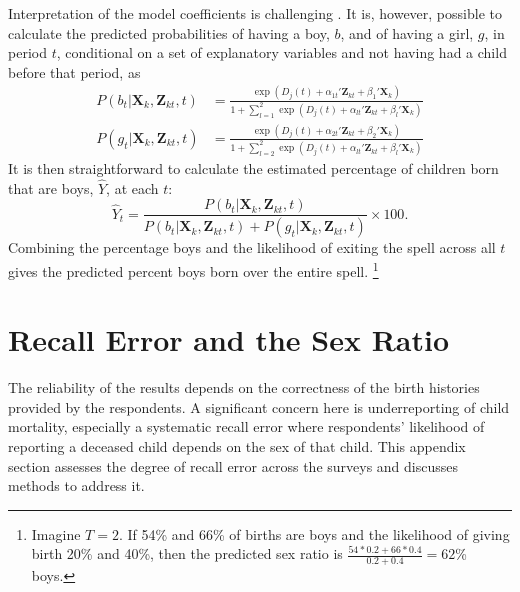 \documentclass[12pt,letterpaper]{article}
\begin{document}
Interpretation of the model coefficients is challenging \citep{thomas96}.
It is, however, possible to calculate the predicted probabilities of 
having a boy, $b$, and of having a girl, $g$, in period $t$, conditional on 
a set of explanatory variables and not having had a child before that period, as
\begin{align}
P(b_{t} | \mathbf{X}_{k}, \mathbf{Z}_{kt}, t ) 
& =  
\frac{ \exp(D_j(t) + \alpha_{1t}' \mathbf{Z}_{kt} + \beta_1' \mathbf{X}_{k} )}
{1 + \sum_{l=1}^2 \exp(D_j(t) + \alpha_{lt} ' \mathbf{Z}_{kt} + \beta_l ' \mathbf{X}_{k})}
\label{eq:probability_boy} \\
P(g_{t} | \mathbf{X}_{k}, \mathbf{Z}_{kt},t ) 
& =  
\frac{ \exp(D_j(t) + \alpha_{2t}'\mathbf{Z}_{kt} + \beta_2'\mathbf{X}_{k} )}
{1 + \sum_{l=2}^2 \exp(D_j(t) + \alpha_{lt}'\mathbf{Z}_{kt} + \beta_l'\mathbf{X}_{k})}
\label{eq:probability_girl}
\end{align}
It is then straightforward to calculate the estimated percentage of children born that 
are boys, $\hat{Y}$, at each $t$:  
\begin{equation}
\hat{Y}_t 
= 
\frac{ P(b_{t} | \mathbf{X}_{k}, \mathbf{Z}_{kt},t )}
{ P(b_{t} | \mathbf{X}_{k}, \mathbf{Z}_{kt},t) + P(g_{t} | \mathbf{X}_{k}, \mathbf{Z}_{kt},t )} 
\times 100.
\label{eq:probability_son}
\end{equation}
Combining the percentage boys and the likelihood of exiting the spell 
across all $t$ gives the predicted percent boys born over the entire spell.%
\footnote{
Imagine $T=2$. 
If 54\% and 66\% of births are boys and the likelihood of giving birth 20\% and 40\%, 
then the predicted sex ratio is $\frac{54*0.2+66*0.4}{0.2+0.4} = 62$\% boys. 
}




\clearpage
\newpage

\section{Recall Error and the Sex Ratio}

\setcounter{figure}{0}
\setcounter{table}{0}

The reliability of the results depends on the correctness of the birth histories
provided by the respondents.
A significant concern here is underreporting of child mortality, especially a systematic
recall error where respondents' likelihood of reporting a deceased child depends on the 
sex of that child. 
This appendix section assesses the degree of recall error across the surveys and discusses 
methods to address it.
\end{document}
